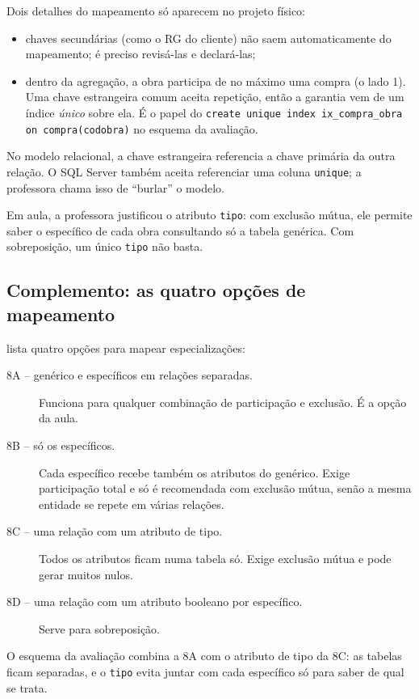 Dois detalhes do mapeamento só aparecem no projeto físico:

\begin{itemize}
	\item chaves secundárias (como o RG do cliente) não saem
	automaticamente do mapeamento; é preciso revisá-las e declará-las;
	\item dentro da agregação, a obra participa de no máximo uma compra (o
	lado 1). Uma chave estrangeira comum aceita repetição, então a
	garantia vem de um índice \emph{único} sobre ela. É o papel do
	\texttt{create unique index ix\_compra\_obra on compra(codobra)} no
	esquema da avaliação.
\end{itemize}

No modelo relacional, a chave estrangeira referencia a chave primária
da outra relação. O SQL Server também aceita referenciar uma coluna
\texttt{unique}; a professora chama isso de ``burlar'' o modelo.

Em aula, a professora justificou o atributo \texttt{tipo}: com exclusão
mútua, ele permite saber o específico de cada obra consultando só a
tabela genérica. Com sobreposição, um único \texttt{tipo} não basta.

\subsection*{Complemento: as quatro opções de mapeamento}

\textcite[seção 9.2, passo 8]{Elmasri2011} lista quatro opções para
mapear especializações:

\begin{description}
	\item[8A -- genérico e específicos em relações separadas.] Funciona
	para qualquer combinação de participação e exclusão. É a opção da
	aula.
	\item[8B -- só os específicos.] Cada específico recebe também os
	atributos do genérico. Exige participação total e só é recomendada com
	exclusão mútua, senão a mesma entidade se repete em várias relações.
	\item[8C -- uma relação com um atributo de tipo.] Todos os atributos
	ficam numa tabela só. Exige exclusão mútua e pode gerar muitos nulos.
	\item[8D -- uma relação com um atributo booleano por específico.]
	Serve para sobreposição.
\end{description}

O esquema da avaliação combina a 8A com o atributo de tipo da 8C: as
tabelas ficam separadas, e o \texttt{tipo} evita juntar com cada
específico só para saber de qual se trata.

